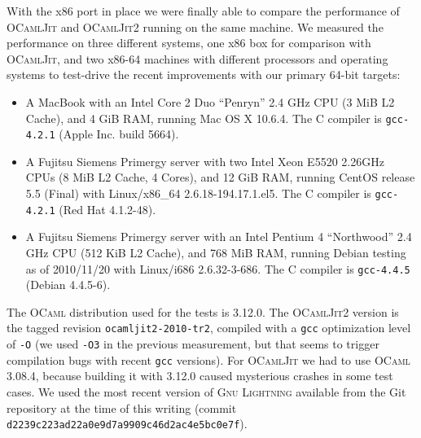 \documentclass[12pt,a4paper,final]{article}
\begin{document}
With the x86 port in place we were finally able to compare the performance of
\textsc{OCamlJit} \cite{Starynkevitch04} and \textsc{OCamlJit2} running on the
same machine. We measured the performance on three different systems, one x86
box for comparison with \textsc{OCamlJit}, and two x86-64 machines with
different processors and operating systems to test-drive the recent improvements
with our primary 64-bit targets:
\begin{itemize}
\item A MacBook with an Intel Core 2 Duo ``Penryn'' 2.4 GHz CPU (3 MiB L2 Cache), and
  4 GiB RAM, running Mac OS X 10.6.4. The C compiler is \texttt{gcc-4.2.1} (Apple Inc.
  build 5664).
\item A Fujitsu Siemens Primergy server with two Intel Xeon E5520 2.26GHz CPUs (8 MiB L2 Cache, 4 Cores),
  and 12 GiB RAM, running CentOS release 5.5 (Final) with Linux/x86\_64 2.6.18-194.17.1.el5.
  The C compiler is \texttt{gcc-4.2.1} (Red Hat 4.1.2-48).
\item A Fujitsu Siemens Primergy server with an Intel Pentium 4 ``Northwood'' 2.4 GHz CPU (512 KiB L2 Cache),
  and 768 MiB RAM, running Debian testing as of 2010/11/20 with Linux/i686 2.6.32-3-686.
  The C compiler is \texttt{gcc-4.4.5} (Debian 4.4.5-6).
\end{itemize}
The \textsc{OCaml} distribution used for the tests is 3.12.0. The \textsc{OCamlJit2} version
is the tagged revision \texttt{ocamljit2-2010-tr2}, compiled with a \texttt{gcc} optimization
level of \texttt{-O} (we used \texttt{-O3} in the previous measurement, but that seems to
trigger compilation bugs with recent \texttt{gcc} versions). For \textsc{OCamlJit} we had to
use \textsc{OCaml} 3.08.4, because building it with 3.12.0 caused mysterious crashes in some
test cases. We used the most recent version of \textsc{Gnu Lightning} \cite{Bonzini10} available from
the Git repository at the time of this writing (commit \texttt{d2239c223ad22a0e9d7a9909c46d2ac4e5bc0e7f}).
\end{document}
